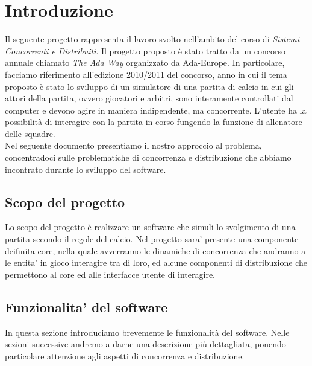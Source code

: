 
\section*{Introduzione}
%
\label{sec:introduzione}

Il seguente progetto rappresenta il lavoro svolto nell'ambito del corso di \emph{Sistemi Concorrenti e Distribuiti}. Il progetto proposto è stato tratto da un concorso annuale chiamato \emph{The Ada Way} organizzato da Ada-Europe. In particolare, facciamo riferimento all'edizione 2010/2011 del concorso, anno in cui il tema proposto è stato lo sviluppo di un simulatore di una partita di calcio in cui gli attori della partita, ovvero giocatori e arbitri, sono interamente controllati dal computer e devono agire in maniera indipendente, ma concorrente. L'utente ha la possibilità di interagire con la partita in corso fungendo la funzione di allenatore delle squadre. \\
Nel seguente documento presentiamo il nostro approccio al problema, concentradoci sulle problematiche di concorrenza e distribuzione che abbiamo incontrato durante lo sviluppo del software.

\subsection*{Scopo del progetto}
%
\label{sec:scopo_del_progetto}
Lo scopo del progetto è realizzare un software che simuli lo svolgimento di una partita secondo il regole del calcio. Nel progetto sara' presente una componente deifinita core, nella quale avverranno le dinamiche di concorrenza che andranno a le entita' in gioco interagire tra di loro, ed alcune componenti di distribuzione che permettono al core ed alle interfacce utente di interagire.

\subsection*{Funzionalita' del software}
%
\label{sec:funzionalita_del_software}

In questa sezione introduciamo brevemente le funzionalità del software. Nelle sezioni successive andremo a darne una descrizione più dettagliata, ponendo particolare attenzione agli aspetti di concorrenza e distribuzione.

